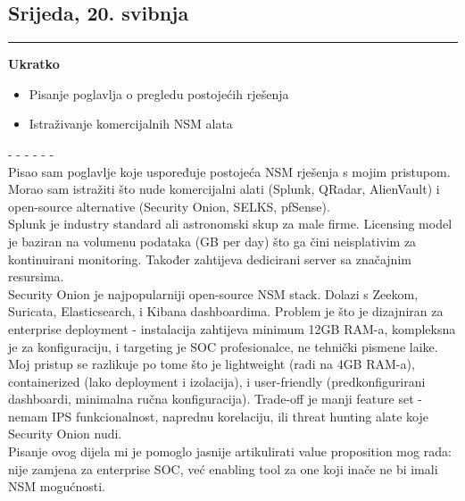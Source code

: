 \documentclass[12pt, a4paper]{article}
\newcommand{\dan}[1]{
    \subsection*{#1}
    \vspace{-0.5em} 
    \hrule \vspace{0.5em} 
}
\begin{document}
\dan{Srijeda, 20. svibnja}
\textbf{Ukratko}
\begin{itemize}
    \item Pisanje poglavlja o pregledu postojećih rješenja
    \item Istraživanje komercijalnih NSM alata
\end{itemize}
- - - - - - \\
Pisao sam poglavlje koje uspoređuje postojeća NSM rješenja s mojim pristupom. Morao sam istražiti što nude komercijalni alati (Splunk, QRadar, AlienVault) i open-source alternative (Security Onion, SELKS, pfSense).
\\
Splunk je industry standard ali astronomski skup za male firme. Licensing model je baziran na volumenu podataka (GB per day) što ga čini neisplativim za kontinuirani monitoring. Također zahtijeva dedicirani server sa značajnim resursima.
\\
Security Onion je najpopularniji open-source NSM stack. Dolazi s Zeekom, Suricata, Elasticsearch, i Kibana dashboardima. Problem je što je dizajniran za enterprise deployment - instalacija zahtijeva minimum 12GB RAM-a, kompleksna je za konfiguraciju, i targeting je SOC profesionalce, ne tehnički pismene laike.
\\
Moj pristup se razlikuje po tome što je lightweight (radi na 4GB RAM-a), containerized (lako deployment i izolacija), i user-friendly (predkonfigurirani dashboardi, minimalna ručna konfiguracija). Trade-off je manji feature set - nemam IPS funkcionalnost, naprednu korelaciju, ili threat hunting alate koje Security Onion nudi.
\\
Pisanje ovog dijela mi je pomoglo jasnije artikulirati value proposition mog rada: nije zamjena za enterprise SOC, već enabling tool za one koji inače ne bi imali NSM mogućnosti.
\end{document}
